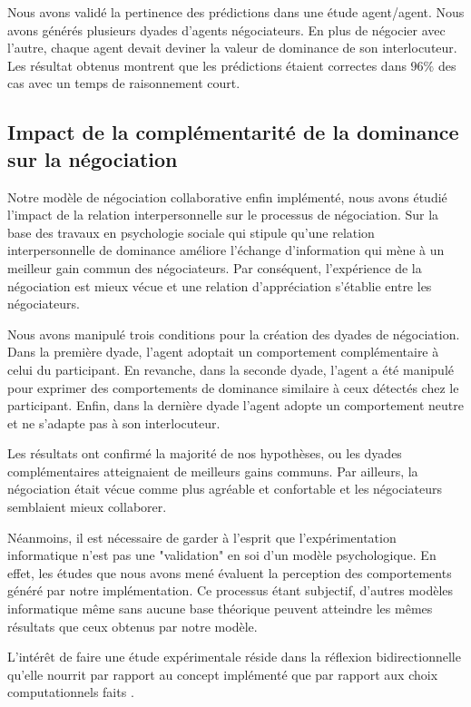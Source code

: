 		Nous avons validé la pertinence des prédictions dans une étude agent/agent. Nous avons générés plusieurs dyades d'agents négociateurs. En plus de négocier avec l'autre, chaque agent devait deviner la valeur de dominance de son interlocuteur.
		Les résultat obtenus montrent que les prédictions étaient correctes dans $96\%$ des cas avec un temps de raisonnement court. 
		
		\subsection{Impact de la complémentarité de la dominance sur la négociation}
		
		Notre modèle de négociation collaborative enfin implémenté, nous avons étudié l'impact de la relation interpersonnelle sur le processus de négociation. 
		Sur la base des travaux en psychologie sociale qui stipule qu'une relation interpersonnelle de dominance améliore l'échange d'information qui mène à un meilleur gain commun des négociateurs. Par conséquent, l'expérience de la négociation est mieux vécue et une relation d'appréciation s'établie entre les négociateurs. 
		
		Nous avons manipulé trois conditions pour la création des dyades de négociation. Dans la première dyade, l'agent adoptait un comportement complémentaire à celui du participant. En revanche, dans la seconde dyade, l'agent a été manipulé pour exprimer des comportements de dominance similaire à ceux détectés chez le participant. Enfin, dans la dernière dyade l'agent adopte un comportement neutre et ne s'adapte pas à son interlocuteur.
		
		Les résultats ont confirmé la majorité de nos hypothèses, ou les dyades complémentaires atteignaient de meilleurs gains communs. Par ailleurs,  la négociation était vécue comme plus agréable et confortable et les négociateurs semblaient mieux collaborer. 
		
		Néanmoins, il est nécessaire de garder à l’esprit que l’expérimentation informatique n’est pas une "validation" en soi d’un modèle psychologique. En effet, les études que nous avons mené évaluent la perception des comportements généré par notre implémentation. Ce processus étant subjectif, d'autres modèles informatique même sans aucune base théorique peuvent atteindre les mêmes résultats que ceux obtenus par notre modèle.
		
		L'intérêt de faire une étude expérimentale réside dans la réflexion bidirectionnelle qu’elle nourrit par rapport au
		concept implémenté que par rapport aux choix computationnels faits \cite{faur2016approche}.
		
